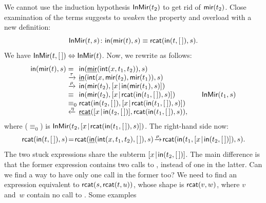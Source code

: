We cannot use the induction hypothesis \(\textsf{InMir}({t_2})\) to get
rid of \(\textsf{mir}(t_2)\). Close examination of the terms suggests to
\emph{weaken} the property and overload  with a new
definition:
\begin{equation*}
\textsf{InMir}({t,s}) \colon \textsf{in}(\textsf{mir}(t),s) \equiv
\textsf{rcat}(\textsf{in}(t,[\,]),s).
\end{equation*}
We have \(\textsf{InMir}({t,[\,]}) \Leftrightarrow \textsf{InMir}({t})\). Now,
we rewrite as follows:
\begin{equation*}
\begin{array}{@{}r@{\;}l@{\;}l@{\qquad}r@{}}
\fun{in}(\fun{mir}(t),s)
& =
& \fun{in}(\ufun{mir}(\fun{int}(x,t_1,t_2)),s)\\
& \xrightarrow{\smash{\tau}}
& \ufun{in}(\fun{int}(x,\fun{mir}(t_2),\fun{mir}(t_1)),s)\\
& \xrightarrow{\smash{\rho}}
& \fun{in}(\fun{mir}(t_2),\cons{x}{\fun{in}(\fun{mir}(t_1),s)})\\
& \equiv
& \fun{in}(\fun{mir}(t_2),\cons{x}{\fun{rcat}(\fun{in}(t_1,\el),s)})
& \IH{\pred{InMir}{t_1,s}}\\
& \equiv_0
& \fun{rcat}(\fun{in}(t_2,\el),\cons{x}{\fun{rcat}(\fun{in}(t_1,\el),s)})\\
& \xleftarrow{\smash{\eta}}
& \ufun{rcat}(\cons{x}{\fun{in}(t_2,\el)},\fun{rcat}(\fun{in}(t_1,\el),s)),
\end{array}
\end{equation*}
where (\(\equiv_0\)) is
\(\textsf{InMir}({t_2,[{x}\!\mid\!{\textsf{rcat}(\textsf{in}(t_1,[\,]),s)}]})\).
The right\hyp{}hand side now:
\begin{equation*}
\textsf{rcat}(\textsf{in}(t,[\,]),s)
\! = \!
 \textsf{rcat}(\underline{\textsf{in}}(\textsf{int}(x,t_1,t_2),[\,]),s)
\! \xrightarrow{\smash{\rho}}\!
 \textsf{rcat}(\textsf{in}(t_1,[{x}\!\mid\!{\textsf{in}(t_2,[\,])}]),s).
\end{equation*}
The two stuck expressions share the subterm
\([{x}\!\mid\!{\textsf{in}(t_2,[\,])}]\). The main
difference is that the former expression contains two calls to
, instead of one in the
latter. Can we find a way to have only one call in the former too?  We
need to find an expression equivalent to
\(\textsf{rcat}(s,\textsf{rcat}(t,u))\), whose shape is \(\textsf{rcat}(v,w)\),
where \(v\) and~\(w\) contain no call to . Some examples
